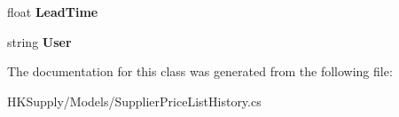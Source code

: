 \begin{DoxyCompactItemize}
\item 
\mbox{\label{class_h_k_supply_1_1_models_1_1_supplier_price_list_history_af4879735e8d6494cae8010e59c3f328b}} 
float {\bfseries Lead\+Time}
\item 
\mbox{\label{class_h_k_supply_1_1_models_1_1_supplier_price_list_history_a46a62601bf1ed3e2e57d29b68fd9f111}} 
string {\bfseries User}
\end{DoxyCompactItemize}


The documentation for this class was generated from the following file\+:\begin{DoxyCompactItemize}
\item 
H\+K\+Supply/\+Models/Supplier\+Price\+List\+History.\+cs\end{DoxyCompactItemize}
